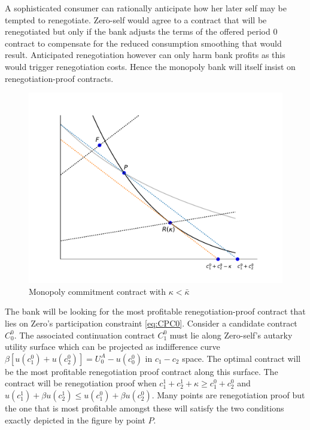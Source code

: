 \documentclass[11pt,english]{article}
\theoremstyle{plain}
\theoremstyle{definition}
\begin{document}
A sophisticated consumer can rationally anticipate how her later self
may be tempted to renegotiate. Zero-self would agree to a contract
that will be renegotiated but only if the bank adjusts the terms of
the offered period 0 contract to compensate for the reduced consumption
smoothing that would result. Anticipated renegotiation however can
only harm bank profits as this would trigger renegotiation costs.
Hence the monopoly bank will itself insist on renegotiation-proof
contracts.

\begin{figure}
  \includegraphics[width=1\textwidth]{MonopolyRP.pdf}
  \caption{Monopoly commitment contract with $\kappa<\bar{\kappa}$}
  \label{fig:monopRP} 
\end{figure}

The bank will be looking for the most profitable renegotiation-proof
contract that lies on Zero's participation constraint \ref{eq:CPC0}.
Consider a candidate contract $C_{0}^{0}$. The associated continuation
contract $C_{1}^{0}$ must lie along Zero-self's autarky utility surface
which can be projected as indifference curve 
$\beta\left[u(c_{1}^{0})+u(c_{2}^{0})\right]=U_{0}^{A}-u(c_{0}^{0})$
in $c_{1}-c_{2}$ space. The optimal contract will be the most profitable
renegotiation proof contract along this surface. The contract will
be renegotiation proof when $c_{1}^{1}+c_{2}^{1}+\kappa\ge c_{1}^{0}+c_{2}^{0}$
and $u(c_{1}^{1})+\beta u(c_{2}^{1})\le u(c_{1}^{0})+\beta u(c_{2}^{0})$.
Many points are renegotiation proof but the one that is most profitable
amongst these will satisfy the two conditions exactly depicted in
the figure by point $P$.
\end{document}
